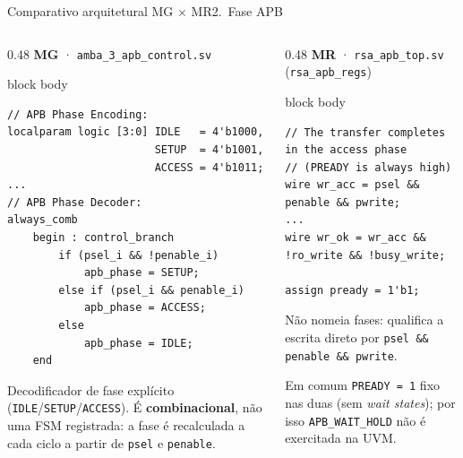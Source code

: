 \documentclass[aspectratio=169,10pt,t]{beamer}
\newcommand{\tmTree}{\fontsize{5.2}{6.1}\selectfont}
\begin{document}
\begin{frame}[fragile]{Comparativo arquitetural MG × MR}{2.~Fase APB}
  \vspace*{-0.3cm}
  \begin{columns}[T]
    \begin{column}{0.48\textwidth}
      {\scriptsize\textbf{\color{tmCafe}MG} · \texttt{amba\_3\_apb\_control.sv}}\\[0.05cm]
      \begin{beamercolorbox}[rounded=true,shadow=false,sep=3pt]{block body}
\vspace*{-0.6\baselineskip}
\tmTree
\begin{verbatim}
// APB Phase Encoding:
localparam logic [3:0] IDLE   = 4'b1000,
                       SETUP  = 4'b1001,
                       ACCESS = 4'b1011;
...
// APB Phase Decoder:
always_comb
    begin : control_branch
        if (psel_i && !penable_i)
            apb_phase = SETUP;
        else if (psel_i && penable_i)
            apb_phase = ACCESS;
        else
            apb_phase = IDLE;
    end
\end{verbatim}
\vspace*{-0.6\baselineskip}
      \end{beamercolorbox}
      \vspace{0.1cm}
      \footnotesize
      Decodificador de fase explícito (\texttt{IDLE}/\texttt{SETUP}/\texttt{ACCESS}). É \textbf{combinacional}, não uma FSM registrada: a fase é recalculada a cada ciclo a partir de \texttt{psel} e \texttt{penable}.
    \end{column}
    \begin{column}{0.48\textwidth}
      {\scriptsize\textbf{\color{tmCafe}MR} · \texttt{rsa\_apb\_top.sv} (\texttt{rsa\_apb\_regs})}\\[0.05cm]
      \begin{beamercolorbox}[rounded=true,shadow=false,sep=3pt]{block body}
\vspace*{-0.6\baselineskip}
\tmTree
\begin{verbatim}
// The transfer completes in the access phase
// (PREADY is always high)
wire wr_acc = psel && penable && pwrite;
...
wire wr_ok = wr_acc && !ro_write && !busy_write;

assign pready = 1'b1;
\end{verbatim}
\vspace*{-0.6\baselineskip}
      \end{beamercolorbox}
      \vspace{0.1cm}
      \footnotesize
      Não nomeia fases: qualifica a escrita direto por \texttt{psel \&\& penable \&\& pwrite}.
      \vspace{0.2cm}
      \begin{block}{Em comum}
        \scriptsize \texttt{PREADY = 1} fixo nas duas (sem \emph{wait states}); por isso \texttt{APB\_WAIT\_HOLD} não é exercitada na UVM.
      \end{block}
    \end{column}
  \end{columns}
\end{frame}
\end{document}
